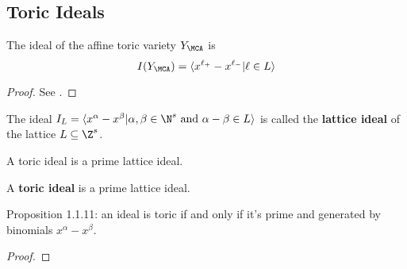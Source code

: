 \subsection{Toric Ideals}


\begin{proposition}
  \label{1-1-9-ideal-ya}

  The ideal of the affine toric variety $Y_\MCA$ is
  \[
    I(Y_\MCA) = \langle x^{\ell_+} - x^{\ell_-} | \ell \in L\rangle
  \]
\end{proposition}
\begin{proof}
  \uses{}

  See \cite{Cox_2011}.
\end{proof}


\begin{definition}
  \label{1-1-10-lat-ideal}
  \uses{}
  \leanok

  The ideal $I_L = \langle x^\alpha - x^\beta | \alpha, \beta \in \N^s \text{ and } \alpha - \beta \in L\rangle$ is called the {\bf lattice ideal} of the lattice $L \subseteq \Z^s$.

  A toric ideal is a prime lattice ideal.
\end{definition}


\begin{definition}
  \label{1-1-10-toric-ideal}
  \leanok
  A {\bf toric ideal} is a prime lattice ideal.
\end{definition}


\begin{proposition}
  \label{1-1-11-toric-ideal-gen-binomial}

  Proposition 1.1.11: an ideal is toric if and only if it's prime and generated by binomials $x^\alpha - x^\beta$.
\end{proposition}
\begin{proof}

\end{proof}



